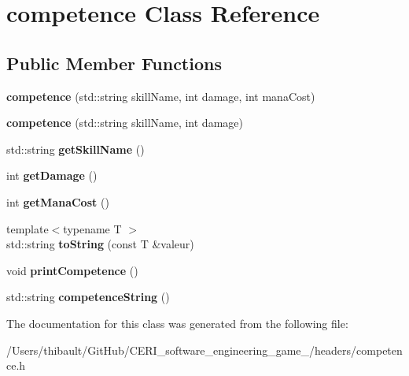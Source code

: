 \hypertarget{classcompetence}{}\section{competence Class Reference}
\label{classcompetence}
\subsection*{Public Member Functions}
\begin{DoxyCompactItemize}
\item 
\mbox{\label{classcompetence_a4a6f74df2714c87fa73c5e0f288aa99a}} 
{\bfseries competence} (std\+::string skill\+Name, int damage, int mana\+Cost)
\item 
\mbox{\label{classcompetence_ad64270b49b95c491d0cbecd7e59561c4}} 
{\bfseries competence} (std\+::string skill\+Name, int damage)
\item 
\mbox{\label{classcompetence_aaafd68247286e0880551aa593a3e6040}} 
std\+::string {\bfseries get\+Skill\+Name} ()
\item 
\mbox{\label{classcompetence_a752380fae93494815023b3a177e57f44}} 
int {\bfseries get\+Damage} ()
\item 
\mbox{\label{classcompetence_a8346c6ae95df148e42f26b9a94655c8f}} 
int {\bfseries get\+Mana\+Cost} ()
\item 
\mbox{\label{classcompetence_adbd67d184b75c46bc22c1aef070d9246}} 
{\footnotesize template$<$typename T $>$ }\\std\+::string {\bfseries to\+String} (const T \&valeur)
\item 
\mbox{\label{classcompetence_a5e486c7db01680742633e93c42a638b3}} 
void {\bfseries print\+Competence} ()
\item 
\mbox{\label{classcompetence_a4acc4e02f7e8c49a6d4d1db307e8f03d}} 
std\+::string {\bfseries competence\+String} ()
\end{DoxyCompactItemize}


The documentation for this class was generated from the following file\+:\begin{DoxyCompactItemize}
\item 
/\+Users/thibault/\+Git\+Hub/\+C\+E\+R\+I\+\_\+software\+\_\+engineering\+\_\+game\+\_/headers/competence.\+h\end{DoxyCompactItemize}

